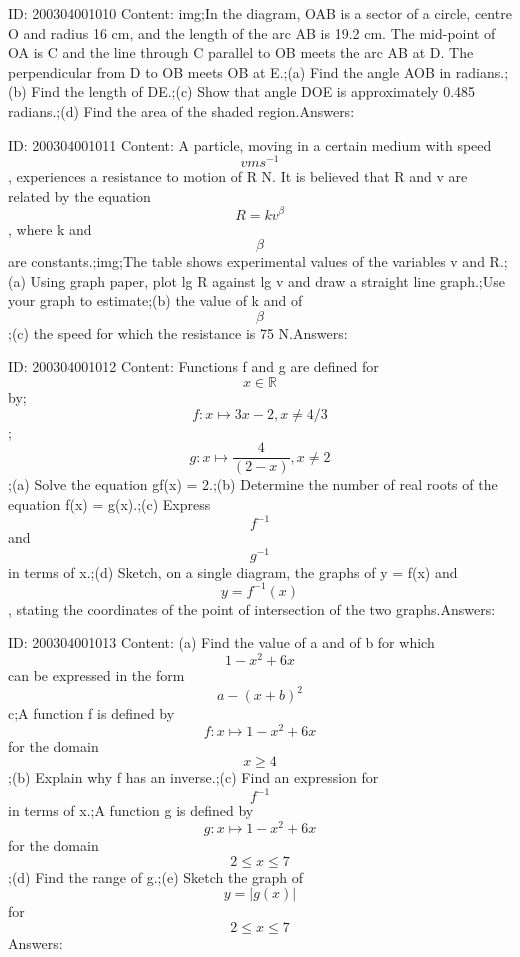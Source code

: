 \documentclass{article}
\begin{document}
ID: 200304001010
Content:
img;In the diagram, OAB is a sector of a circle, centre O and radius 16 cm, and the length of the arc AB is 19.2 cm. The mid-point of OA is C and the line through C parallel to OB meets the arc AB at D. The perpendicular from D to OB meets OB at E.;(a)	Find the angle AOB in radians.;(b)	Find the length of DE.;(c)	Show that angle DOE is approximately 0.485 radians.;(d)	Find the area of the shaded region.Answers:

ID: 200304001011
Content:
A particle, moving in a certain medium with speed $$v ms^{-1}$$, experiences a resistance to motion of R N. It is believed that R and v are related by the equation $$R=kv^{\beta}$$, where k and $$\beta$$ are constants.;img;The table shows experimental values of the variables v and R.;(a)	Using graph paper, plot lg R against lg v and draw a straight line graph.;Use your graph to estimate;(b)	the value of k and of $$\beta$$;(c)	the speed for which the resistance is 75 N.Answers:

ID: 200304001012
Content:
Functions f and g are defined for $$x\in \mathbb{R}$$ by;$$f: x \mapsto 3x-2,x\neq4/3$$;$$g: x \mapsto \frac{4}{(2-x)},x\neq2$$;(a)	Solve the equation gf(x) = 2.;(b)	Determine the number of real roots of the equation f(x) = g(x).;(c)	Express $$f^{-1}$$ and $$g^{-1}$$ in terms of x.;(d)	Sketch, on a single diagram, the graphs of y = f(x) and $$y=f^{-1}(x)$$, stating the coordinates of the point of intersection of the two graphs.Answers:

ID: 200304001013
Content:
(a)	Find the value of a and of b for which $$1-x^2+6x$$ can be expressed in the form $$a-(x+b)^2$$c;A function f is defined by $$f: x \mapsto 1-x^2+6x$$ for the domain $$x\geq4$$;(b)	Explain why f has an inverse.;(c)	Find an expression for $$f^{-1}$$ in terms of x.;A function g is defined by $$g: x \mapsto 1-x^2+6x$$ for the domain $$2\leq x\leq7$$;(d)	Find the range of g.;(e)	Sketch the graph of $$y=|g(x)|$$ for $$2\leq x\leq7$$Answers:
\end{document}
